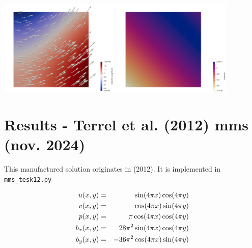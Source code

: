 \begin{center}
\includegraphics[width=5.7cm]{python_codes/fieldstone_120/paperresults/lire19/vel}
\includegraphics[width=5.7cm]{python_codes/fieldstone_120/paperresults/lire19/press}
\end{center}










\newpage
\section*{Results - Terrel et al. (2012) mms (nov. 2024)}

This manufactured solution originates in \textcite{tesk12} (2012).
It is implemented in \verb|mms_tesk12.py|

\begin{eqnarray}
u(x,y) &=& \sin(4\pi x)\cos(4 \pi y) \nonumber\\
v(x,y) &=& -\cos(4\pi x)\sin(4 \pi y) \nonumber\\
p(x,y) &=& \pi \cos(4 \pi x) \cos(4 \pi y) \nonumber\\
b_x(x,y) &=& 28 \pi^2 \sin(4 \pi x) \cos(4 \pi y) \nonumber\\
b_y(x,y) &=& -36 \pi^2 \cos(4 \pi x) \sin(4 \pi y) 
\end{eqnarray}

